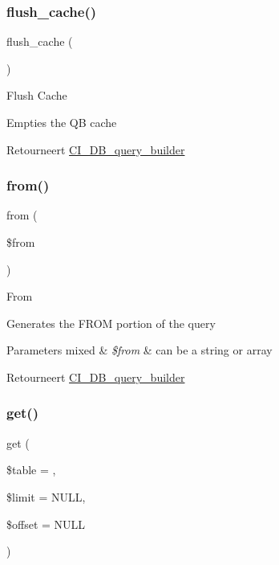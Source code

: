 \subsubsection{\texorpdfstring{flush\_cache()}{flush\_cache()}}
{\footnotesize\ttfamily flush\+\_\+cache (\begin{DoxyParamCaption}{ }\end{DoxyParamCaption})}

Flush Cache

Empties the QB cache

\begin{DoxyReturn}{Retourneert}
\mbox{\hyperlink{class_c_i___d_b__query__builder}{C\+I\+\_\+\+D\+B\+\_\+query\+\_\+builder}} 
\end{DoxyReturn}
\mbox{\label{class_c_i___d_b__query__builder_a91f5f004ed8e2237a4decc5d23ac3457}} 
\subsubsection{\texorpdfstring{from()}{from()}}
{\footnotesize\ttfamily from (\begin{DoxyParamCaption}\item[{}]{\$from }\end{DoxyParamCaption})}

From

Generates the F\+R\+OM portion of the query


\begin{DoxyParams}[1]{Parameters}
mixed & {\em \$from} & can be a string or array \\
\hline
\end{DoxyParams}
\begin{DoxyReturn}{Retourneert}
\mbox{\hyperlink{class_c_i___d_b__query__builder}{C\+I\+\_\+\+D\+B\+\_\+query\+\_\+builder}} 
\end{DoxyReturn}
\mbox{\label{class_c_i___d_b__query__builder_a02c629b7cdb54c95ccc23c21d910320d}} 
\subsubsection{\texorpdfstring{get()}{get()}}
{\footnotesize\ttfamily get (\begin{DoxyParamCaption}\item[{}]{\$table = {\ttfamily \textquotesingle{}\textquotesingle{}},  }\item[{}]{\$limit = {\ttfamily NULL},  }\item[{}]{\$offset = {\ttfamily NULL} }\end{DoxyParamCaption})}


